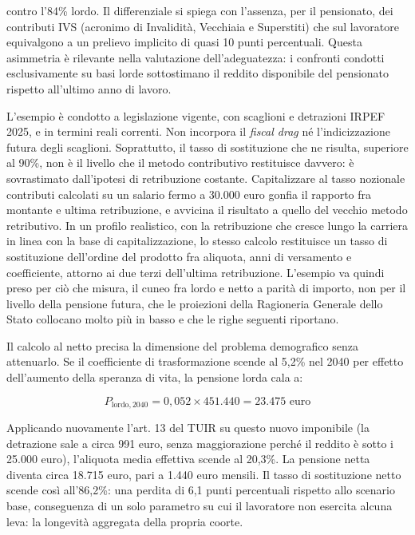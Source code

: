 contro l'84\% lordo. Il differenziale si spiega con l'assenza, per il
pensionato, dei contributi IVS (acronimo di Invalidità, Vecchiaia e Superstiti) che sul lavoratore equivalgono a un prelievo
implicito di quasi 10 punti percentuali. Questa asimmetria è rilevante nella
valutazione dell'adeguatezza: i confronti condotti esclusivamente su basi lorde
sottostimano il reddito disponibile del pensionato rispetto all'ultimo anno
di lavoro.

L'esempio è condotto a legislazione vigente, con scaglioni e detrazioni IRPEF 2025,
e in termini reali correnti. Non incorpora il \emph{fiscal drag} né l'indicizzazione
futura degli scaglioni. Soprattutto, il tasso di sostituzione che ne risulta,
superiore al 90\%, non è il livello che il metodo contributivo restituisce davvero:
è sovrastimato dall'ipotesi di retribuzione costante. Capitalizzare al tasso nozionale
contributi calcolati su un salario fermo a 30.000 euro gonfia il rapporto fra montante
e ultima retribuzione, e avvicina il risultato a quello del vecchio metodo retributivo.
In un profilo realistico, con la retribuzione che cresce lungo la carriera in linea
con la base di capitalizzazione, lo stesso calcolo restituisce un tasso di sostituzione
dell'ordine del prodotto fra aliquota, anni di versamento e coefficiente, attorno
ai due terzi dell'ultima retribuzione. L'esempio va quindi preso per ciò che misura,
il cuneo fra lordo e netto a parità di importo, non per il livello della pensione
futura, che le proiezioni della Ragioneria Generale dello Stato collocano molto più
in basso e che le righe seguenti riportano.

Il calcolo al netto precisa la dimensione del problema demografico senza attenuarlo.
Se il coefficiente di trasformazione scende al 5,2\% nel 2040 per effetto dell'aumento
della speranza di vita, la pensione lorda cala a:

\[
P_{\text{lordo},2040} = 0{,}052 \times 451.440 = 23.475 \text{ euro}
\]

Applicando nuovamente l'art. 13 del TUIR su questo nuovo imponibile (la detrazione sale a circa 991 euro, senza maggiorazione perché il reddito è sotto i 25.000 euro), l'aliquota media effettiva scende al 20,3\%. La pensione netta diventa circa 18.715 euro, pari a 1.440 euro mensili. Il tasso di sostituzione netto scende così all'86,2\%: una perdita di 6,1 punti percentuali rispetto allo scenario base, conseguenza di un solo parametro su cui il lavoratore non esercita alcuna leva: la longevità aggregata della propria coorte.

